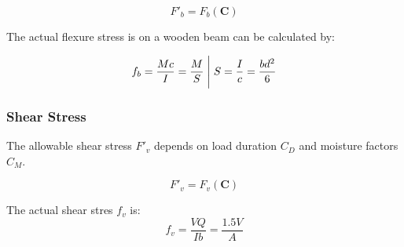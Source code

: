 \begin{equation}\label{eq:allowable-flexture-stress}
F'_{b} = F_b(\mathbf C)
\end{equation}

The actual flexure stress is on a wooden beam can be calculated by:

\begin{equation}\label{eq:actual-flexture-stress}
f_b = \frac{Mc}{I} = \frac{M}{S} \Biggm\lvert S = \frac{I}{c} = \frac{bd^2}{6}
\end{equation}

\subsubsection{Shear Stress}

The allowable shear stress $F'_v$ depends on load duration $C_D$ and moisture
factors $C_M$.

\begin{equation}\label{eq:allowable-shear-stress}
F'_v = F_v(\mathbf C)
\end{equation}

The actual shear stres $f_v$ is:
\begin{equation}\label{eq:actual-shear-stress}
f_v =   \frac{VQ}{Ib} = \frac{1.5 V}{A}
\end{equation}
